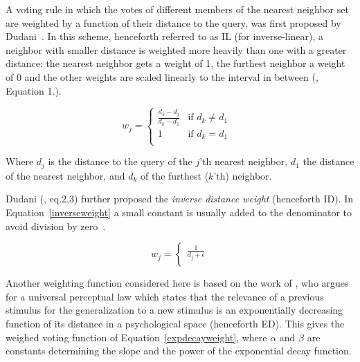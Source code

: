 \documentclass{report}
\begin{document}
A voting rule in which the votes of different members of the nearest
neighbor set are weighted by a function of their distance to the
query, was first proposed by Dudani~. In this
scheme, henceforth referred to as IL (for inverse-linear), a neighbor
with smaller distance is weighted more heavily than one with a greater
distance: the nearest neighbor gets a weight of 1, the furthest
neighbor a weight of 0 and the other weights are scaled linearly to
the interval in between (, Equation 1.).

\begin{equation}
\label{dudani_eq}
w_{j}= \left \{ \begin{array}{ll}  
                        \frac{d_{k} - d_{j}}{d_{k} - d_{1}} & \mbox{if $d_{k}
\not= d_{1}$ } \\ 
                        1 & \mbox{if $d_{k} = d_{1}$}\\
                    \end{array} 
          \right. 
\end{equation}

Where $d_{j}$ is the distance to the query of the $j$'th nearest
neighbor, $d_{1}$ the distance of the nearest neighbor, and $d_{k}$ of
the furthest ($k$'th) neighbor.

Dudani (, eq.2,3) further proposed the {\em inverse
distance weight} (henceforth ID). In Equation~\ref{inverseweight} a
small constant is usually added to the denominator to avoid division
by zero~\cite{Wettschereck94}.

\begin{equation}
\label{inverseweight}
w_{j}= \left \{ \begin{array}{ll}  
                        \frac{1}{d_{j} + \epsilon} \\ 
                    \end{array} 
          \right. 
\end{equation}

Another weighting function considered here is based on the work of
, who argues for a universal perceptual law which
states that the relevance of a previous stimulus for the
generalization to a new stimulus is an exponentially decreasing
function of its distance in a psychological space (henceforth
ED). This gives the weighed voting function of
Equation~\ref{expdecayweight}, where $\alpha$ and $\beta$ are
constants determining the slope and the power of the exponential decay
function.
\end{document}
